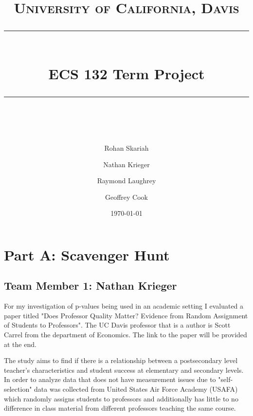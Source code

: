 \documentclass{article}
\numberwithin{equation}{section}
\begin{document}
\title{	
	\normalfont\normalsize
	\textsc{University of California, Davis} \\ %
	\vspace{25pt} %
	\rule{\linewidth}{0.5pt} \\ %
	\vspace{20pt} %
	{\huge ECS 132 Term Project} \\ %
	\vspace{12pt} %
	\rule{\linewidth}{2pt} \\ %
	\vspace{12pt} %
}

\author{Rohan Skariah \and Nathan Krieger \and Raymond Laughrey \and Geoffrey Cook}
\date{\normalsize\today}
\maketitle


\newpage

\section{Part A: Scavenger Hunt}

\subsection{Team Member 1: Nathan Krieger}

For my investigation of p-values being used in an academic setting I evaluated a paper titled "Does Professor Quality Matter? Evidence from Random Assignment of Students to Professors". The UC Davis professor that is a author is Scott Carrel from the department of Economics. The link to the paper will be provided at the end. 

The study aims to find if there is a relationship between a postsecondary level teacher's characteristics and student success at elementary and secondary levels. In order to analyze data that does not have measurement issues due to "self-selection" data was collected from United States Air Force Academy (USAFA) which randomly assigns students to professors and additionally has little to no difference in class material from different professors teaching the same course. 
\end{document}
